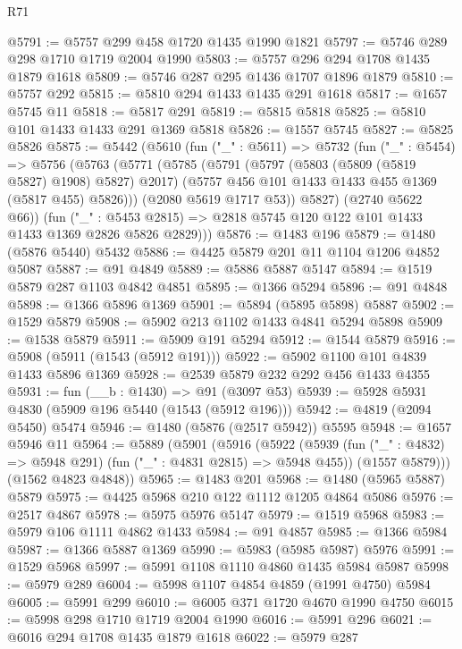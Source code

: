 \begin{lexlean}{R71}
\begin{coremodule}
@5791 := @5757 @299 @458 @1720 @1435 @1990 @1821
@5797 := @5746 @289 @298 @1710 @1719 @2004 @1990
@5803 := @5757 @296 @294 @1708 @1435 @1879 @1618
@5809 := @5746 @287 @295 @1436 @1707 @1896 @1879
@5810 := @5757 @292
@5815 := @5810 @294 @1433 @1435 @291 @1618
@5817 := @1657 @5745 @11
@5818 := @5817 @291
@5819 := @5815 @5818
@5825 := @5810 @101 @1433 @1433 @291 @1369 @5818
@5826 := @1557 @5745
@5827 := @5825 @5826
@5875 := @5442
    (@5610
      (fun ("_" : @5611) =>
      @5732
        (fun ("_" : @5454) =>
        @5756
          (@5763
            (@5771
              (@5785
                (@5791
                  (@5797 (@5803 (@5809 (@5819 @5827) @1908) @5827) @2017)
                  (@5757 @456 @101 @1433 @1433 @455 @1369 (@5817 @455) @5826)))
              (@2080 @5619 @1717 @53))
            @5827)
          (@2740 @5622 @66))
        (fun ("_" : @5453 @2815) =>
        @2818 @5745 @120 @122 @101 @1433 @1433 @1369 @2826 @5826 @2829)))
@5876 := @1483 @196
@5879 := @1480 (@5876 @5440) @5432
@5886 := @4425 @5879 @201 @11 @1104 @1206 @4852 @5087
@5887 := @91 @4849
@5889 := @5886 @5887 @5147
@5894 := @1519 @5879 @287 @1103 @4842 @4851
@5895 := @1366 @5294
@5896 := @91 @4848
@5898 := @1366 @5896 @1369
@5901 := @5894 (@5895 @5898) @5887
@5902 := @1529 @5879
@5908 := @5902 @213 @1102 @1433 @4841 @5294 @5898
@5909 := @1538 @5879
@5911 := @5909 @191 @5294
@5912 := @1544 @5879
@5916 := @5908 (@5911 (@1543 (@5912 @191)))
@5922 := @5902 @1100 @101 @4839 @1433 @5896 @1369
@5928 := @2539 @5879 @232 @292 @456 @1433 @4355
@5931 := fun (__b : @1430) => @91 (@3097 @53)
@5939 := @5928 @5931 @4830 (@5909 @196 @5440 (@1543 (@5912 @196)))
@5942 := @4819 (@2094 @5450) @5474
@5946 := @1480 (@5876 (@2517 @5942)) @5595
@5948 := @1657 @5946 @11
@5964 := @5889
    (@5901
      (@5916
        (@5922
          (@5939 (fun ("_" : @4832) => @5948 @291) (fun ("_" : @4831 @2815) => @5948 @455))
          (@1557 @5879)))
      (@1562 @4823 @4848))
@5965 := @1483 @201
@5968 := @1480 (@5965 @5887) @5879
@5975 := @4425 @5968 @210 @122 @1112 @1205 @4864 @5086
@5976 := @2517 @4867
@5978 := @5975 @5976 @5147
@5979 := @1519 @5968
@5983 := @5979 @106 @1111 @4862 @1433
@5984 := @91 @4857
@5985 := @1366 @5984
@5987 := @1366 @5887 @1369
@5990 := @5983 (@5985 @5987) @5976
@5991 := @1529 @5968
@5997 := @5991 @1108 @1110 @4860 @1435 @5984 @5987
@5998 := @5979 @289
@6004 := @5998 @1107 @4854 @4859 (@1991 @4750) @5984
@6005 := @5991 @299
@6010 := @6005 @371 @1720 @4670 @1990 @4750
@6015 := @5998 @298 @1710 @1719 @2004 @1990
@6016 := @5991 @296
@6021 := @6016 @294 @1708 @1435 @1879 @1618
@6022 := @5979 @287

\end{coremodule}
\end{lexlean}
